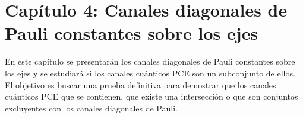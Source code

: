 \section*{Capítulo 4: Canales diagonales de Pauli constantes 
sobre los ejes}
En este capítulo se presentarán los canales diagonales de Pauli constantes 
sobre los ejes \cite{nathanson2007pauli} y se estudiará si los canales
cuánticos PCE son un subconjunto de ellos. El objetivo es buscar una 
prueba definitiva para demostrar que los canales cuánticos PCE que se contienen, 
que existe una intersección o que son conjuntos excluyentes con los canales 
diagonales de Pauli.
